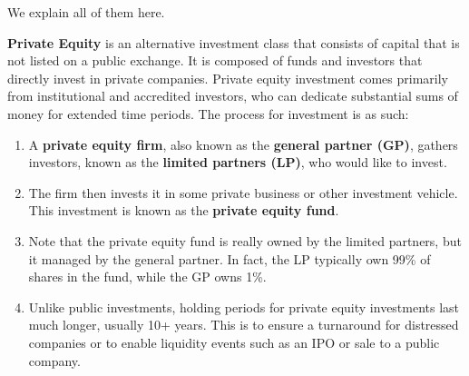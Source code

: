 \documentclass{article}
\begin{document}
    We explain all of them here. 

    \begin{definition}
      \label{def:private-equity}
      \textbf{Private Equity} is an alternative investment class that consists of capital that is not listed on a public exchange. It is composed of funds and investors that directly invest in private companies. Private equity investment comes primarily from institutional and accredited investors, who can dedicate substantial sums of money for extended time periods. The process for investment is as such: 
      \begin{enumerate}
        \item A \textbf{private equity firm}, also known as the \textbf{general partner (GP)}, gathers investors, known as the \textbf{limited partners (LP)}, who would like to invest. 
        \item The firm then invests it in some private business or other investment vehicle. This investment is known as the \textbf{private equity fund}. 
        \item Note that the private equity fund is really owned by the limited partners, but it managed by the general partner. In fact, the LP typically own 99\% of shares in the fund, while the GP owns 1\%. 
        \item Unlike public investments, holding periods for private equity investments last much longer, usually 10+ years. This is to ensure a turnaround for distressed companies or to enable liquidity events such as an IPO or sale to a public company.  
      \end{enumerate}
    \end{definition}
\end{document}
